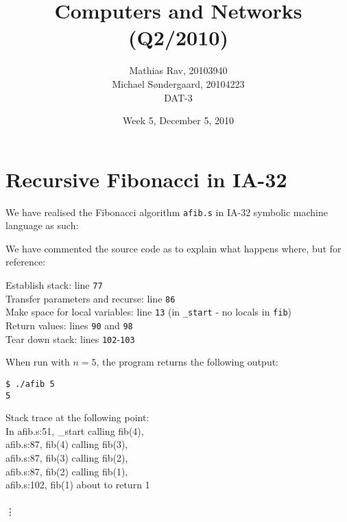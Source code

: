 \documentclass[12pt,a4paper]{article}
\title{Computers and Networks (Q2/2010)}
\author{Mathias Rav, 20103940 \\
		Michael Søndergaard, 20104223 \\
		DAT-3}
\date{Week 5, December 5, 2010}
\begin{document}
\maketitle

\section{Recursive Fibonacci in IA-32}
We have realised the Fibonacci algorithm \texttt{afib.s} in IA-32 symbolic machine language as such:



We have commented the source code as to explain what happens where, but for reference:

Establish stack: line \texttt{77} \\
Transfer parameters and recurse: line \texttt{86} \\
Make space for local variables: line \texttt{13} (in \texttt{\_start} - no locals in \texttt{fib}) \\
Return values: lines \texttt{90} and \texttt{98} \\
Tear down stack: lines \texttt{102}-\texttt{103}

When run with $n=5$, the program returns the following output:
\lstset{numbers=none}
\begin{lstlisting}
$ ./afib 5  
5
\end{lstlisting}

Stack trace at the following point:   \\
In afib.s:51, \_start calling fib(4), \\
   afib.s:87, fib(4) calling fib(3),  \\
   afib.s:87, fib(3) calling fib(2),  \\
   afib.s:87, fib(2) calling fib(1),  \\
   afib.s:102, fib(1) about to return 1 \\
\\
   \vdots
\\
\end{document}
